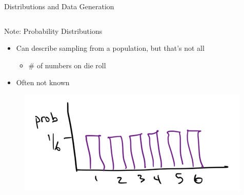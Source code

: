 \documentclass[aspectratio=169]{../latex_main/tntbeamer}  %
\begin{document}
\begin{frame}{Distributions and Data Generation}
\begin{columns}
	        
	        \begin{column}{.3\textwidth}
	            Note: Probability Distributions
	            \begin{itemize}
	                \item Can describe sampling from a population, but that’s not all
	                \begin{itemize}
	                    \item \# of numbers on die roll
	                \end{itemize}
	                \item Often not known
	            \end{itemize}
                \begin{figure}
                    \includegraphics[scale=.5]{Bild12}
                \end{figure}
	        \end{column}
	    \end{columns}
	    
	\end{frame}
	
\end{document}
